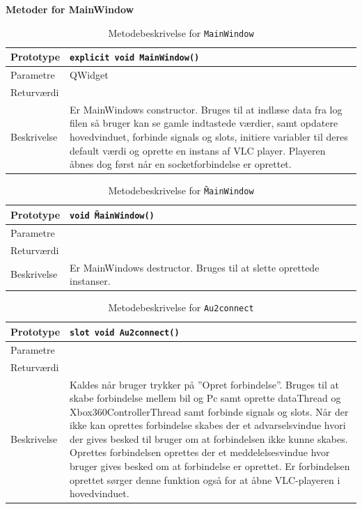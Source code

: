 \textbf{Metoder for MainWindow}

\begin{table}[H]
\begin{tabularx}{\textwidth}{| L{2.5 cm} | Z |} \hline
Prototype & \texttt{explicit void MainWindow()} \\\hline
Parametre &  QWidget \\\hline
Returværdi &  \\\hline
Beskrivelse & Er MainWindows constructor. Bruges til at indlæse data fra log filen så bruger kan se gamle indtastede værdier, samt opdatere hovedvinduet, forbinde signals og slots, initiere variabler til deres default værdi og oprette en instans af VLC player. Playeren åbnes dog først når en socketforbindelse er oprettet.   \\\hline
\end{tabularx}
\caption{Metodebeskrivelse for \texttt{MainWindow}}
\label{table:met_MainWindow}
\end{table}

\begin{table}[H]
\begin{tabularx}{\textwidth}{| L{2.5 cm} | Z |} \hline
Prototype & \texttt{void \~MainWindow()} \\\hline
Parametre &  \\\hline
Returværdi &  \\\hline
Beskrivelse & Er MainWindows destructor. Bruges til at slette oprettede instanser. \\\hline
\end{tabularx}
\caption{Metodebeskrivelse for \texttt{\~MainWindow}}
\label{table:met_sMainWindow}
\end{table}


\begin{table}[H]
\begin{tabularx}{\textwidth}{| L{2.5 cm} | Z |} \hline
Prototype & \texttt{slot void Au2connect()} \\\hline
Parametre &   \\\hline
Returværdi &  \\\hline
Beskrivelse & Kaldes når bruger trykker på ''Opret forbindelse''. Bruges til at skabe forbindelse mellem bil og Pc samt oprette dataThread og Xbox360ControllerThread samt forbinde signals og slots. Når der ikke kan oprettes forbindelse skabes der et advarselsvindue hvori der gives besked til bruger om at forbindelsen ikke kunne skabes. Oprettes forbindelsen oprettes der et meddelelsesvindue hvor bruger gives besked om at forbindelse er oprettet. Er forbindelsen oprettet sørger denne funktion også for at åbne VLC-playeren i hovedvinduet. \\\hline
\end{tabularx}
\caption{Metodebeskrivelse for \texttt{Au2connect}}
\label{table:met_Au2connect}
\end{table}

